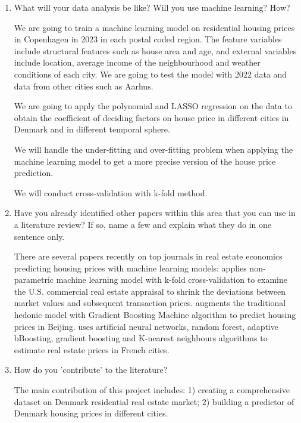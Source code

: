 \documentclass[12pt]{article} %
\begin{document}
\begin{enumerate}
  \item What will your data analysis be like? Will you use machine learning? How?\par
		We are going to train a machine learning model on residential housing prices in Copenhagen in 2023 in each postal coded region. The feature variables include structural features such as house area and age, and external variables include location, average income of the neighbourhood and weather conditions of each city. We are going to test the model with 2022 data and data from other cities such as Aarhus.\par
		We are going to apply the polynomial and LASSO regression on the data to obtain the coefficient of deciding factors on house price in different cities in Denmark and in different temporal sphere.\par
		We will handle the under-fitting and over-fitting problem when applying the machine learning model to get a more precise version of the house price prediction.\par
		We will conduct cross-validation with k-fold method.\par
		
  \item Have you already identified other papers within this area that you can use in a literature review? If so, name a few and explain what they do in one sentence only.\par
		There are several papers recently on top journals in real estate economics predicting housing prices with machine learning models: \newline
		\cite{Deppneretal2023} applies non-parametric machine learning model with k-fold cross-validation to examine the U.S. commercial real estate appraisal to shrink the deviations between market values and subsequent transaction prices. \newline
		\cite{Linetal2023} augments the traditional hedonic model with Gradient Boosting Machine algorithm to predict housing prices in Beijing. \newline
		\cite{TchuenteNyawa2022} uses artificial neural networks, random forest, adaptive bBoosting, gradient boosting and K-nearest neighbours algorithms to estimate real estate prices in French cities.
		
  \item How do you 'contribute' to the literature?\par
		The main contribution of this project includes: 1) creating a comprehensive dataset on Denmark residential real estate market; 2) building a predictor of Denmark housing prices in different cities.
\end{enumerate}
	
\newpage	
\footnotesize


\end{document}

